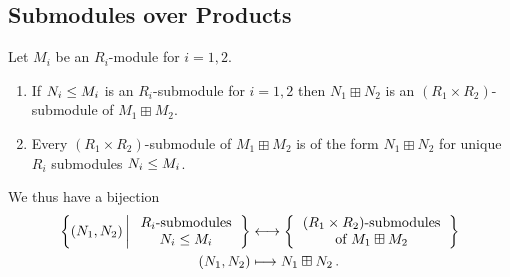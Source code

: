 \subsection{Submodules over Products}


\begin{proposition}
  \label{proposition: submodules of products over rings}
  Let $M_i$ be an $R_i$-module for $i = 1, 2$.
  \begin{enumerate}
    \item
      If $N_i \leq M_i$ is an $R_i$-submodule for $i = 1, 2$ then $N_1 \boxplus N_2$ is an $(R_1 \times R_2)$-submodule of $M_1 \boxplus M_2$.
    \item
      Every $(R_1 \times R_2)$-submodule of $M_1 \boxplus M_2$ is of the form $N_1 \boxplus N_2$ for unique $R_i$ submodules $N_i \leq M_i$.
  \end{enumerate}
  We thus have a bijection
  \begin{align*}
    \left\{
      (N_1, N_2)
    \suchthat*
      \begin{tabular}{c}
        $R_i$-submodules  \\
        $N_i \moduleleq M_i$
      \end{tabular}
    \right\}
    &\longleftrightarrow
    \left\{
      \begin{tabular}{c}
        $(R_1 \times R_2)$-submodules \\
        of $M_1 \boxplus M_2$
      \end{tabular}
    \right\}
    \\
    (N_1, N_2)
    &\longmapsto
    N_1 \boxplus N_2 \,.
  \end{align*}
\end{proposition}


